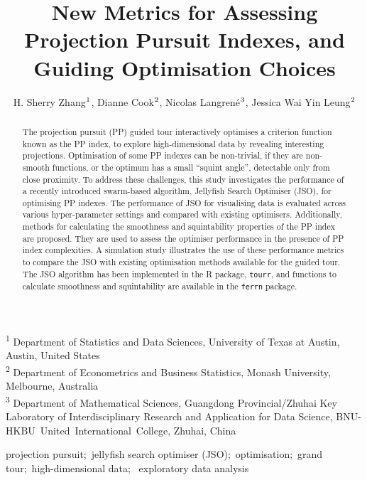 \documentclass[
  12pt,
]{interact}
\title{New Metrics for Assessing Projection Pursuit Indexes, and Guiding
Optimisation Choices}
\author{H. Sherry Zhang$\textsuperscript{1}$, Dianne
Cook$\textsuperscript{2}$, Nicolas
Langrené$\textsuperscript{3}$, Jessica Wai Yin
Leung$\textsuperscript{2}$}
\theoremstyle{plain}
\begin{document}
\captionsetup{labelsep=space}
\maketitle
\textsuperscript{1} Department of Statistics and Data
Sciences, University of Texas at Austin, Austin, United
States\\ \textsuperscript{2} Department of Econometrics and Business
Statistics, Monash
University, Melbourne, Australia\\ \textsuperscript{3} Department of
Mathematical Sciences, Guangdong Provincial/Zhuhai Key Laboratory of
Interdisciplinary Research and Application for Data Science,
BNU-HKBU~United~International~College, Zhuhai, China
\begin{abstract}
The projection pursuit (PP) guided tour interactively optimises a
criterion function known as the PP index, to explore high-dimensional
data by revealing interesting projections. Optimisation of some PP
indexes can be non-trivial, if they are non-smooth functions, or the
optimum has a small ``squint angle'', detectable only from close
proximity. To address these challenges, this study investigates the
performance of a recently introduced swarm-based algorithm, Jellyfish
Search Optimiser (JSO), for optimising PP indexes. The performance of
JSO for visualising data is evaluated across various hyper-parameter
settings and compared with existing optimisers. Additionally, methods
for calculating the smoothness and squintability properties of the PP
index are proposed. They are used to assess the optimiser performance in
the presence of PP index complexities. A simulation study illustrates
the use of these performance metrics to compare the JSO with existing
optimisation methods available for the guided tour. The JSO algorithm
has been implemented in the R package, \texttt{tourr}, and functions to
calculate smoothness and squintability are available in the
\texttt{ferrn} package.
\end{abstract}
\begin{keywords}
\def\sep{;\ }
projection pursuit\sep jellyfish search optimiser
(JSO)\sep optimisation\sep grand tour\sep high-dimensional data\sep 
exploratory data analysis
\end{keywords}
\ifdefined\Shaded\renewenvironment{Shaded}{\begin{tcolorbox}[breakable, interior hidden, frame hidden, sharp corners, enhanced, borderline west={3pt}{0pt}{shadecolor}, boxrule=0pt]}{\end{tcolorbox}}\fi
\end{document}
